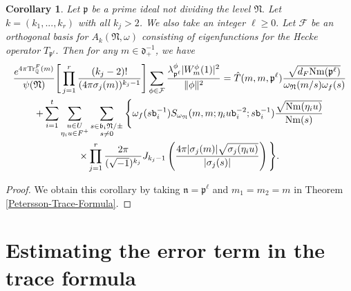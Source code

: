 \documentclass[reqno]{amsart}
\theoremstyle{plain}
\newtheorem{corollary}[theorem]{Corollary}
\theoremstyle{definition}
\theoremstyle{remark}
\def\Nr{\mathrm{Nm}}
\def\b{\mathtt b}
\begin{document}
\begin{corollary}
Let $\mathfrak{p}$ be a prime ideal not dividing the level $\mathfrak{N}.$   Let $k=(k_1,...,k_r)$ with all $k_j>2$. We also take an integer $\ell \geq 0.$ Let $\mathcal{F}$ be an orthogonal basis for $A_{k}(\mathfrak{N},\omega)$ consisting of eigenfunctions for the Hecke operator $T_\mathfrak{\mathfrak{p}^\ell}.$ Then for any $m\in \mathfrak{d}_+^{-1}$, we have
\begin{multline*} 
\frac{e^{4\pi \mathrm{Tr}_{\mathbb{Q}}^F (m)}}{\psi(\mathfrak{N})}\Bigg[\prod_{j=1}^r  \frac{(k_j-2)!}{(4\pi \sigma_j(m))^{k_j-1}}\Bigg]
\sum_{{\phi}\in \mathcal{F} }\frac{\lambda^\phi_\mathfrak{\mathfrak{p}^\ell}  |W_{m}^\phi(1)|^2 }{\|\phi \|^2}
=  \Hat{T}(m,m,\mathfrak{\mathfrak{p}^\ell}) \frac{\sqrt{d_F\Nr(\mathfrak{p}^\ell)}}{\omega_\mathfrak{N}(m/s)\omega_{f}(s)} \\
+\sum_{i=1}^t\sum_{\substack{u\in U \\ \eta_i u\in F^+}} \sum_{\substack{s\in \mathfrak{b_i}\mathfrak{N}/\pm \\ s\neq 0 }}\Bigg\{\omega_{f}(s\b_i^{-1} ) S_{\omega_\mathfrak{N}} (m,m;\eta_i u \b_i^{-2};s\b_i^{-1})
\frac{\sqrt{\Nr(\eta_i u)}} {\Nr(s)} \\
 \times \prod_{j=1}^r\frac{2\pi}{(\sqrt{-1})^{k_j}}J_{k_j-1} \left(  \frac{4 \pi    |\sigma_j(m)| \sqrt{\sigma_j (\eta_i u  )}}{|\sigma_j(s)|} \right) \Bigg\}.
\end{multline*}
\end{corollary}    
    
    \begin{proof}
    We obtain this corollary by taking $\mathfrak{n}=\mathfrak{p}^\ell$ and $m_1=m_2=m $   in Theorem \ref{Petersson-Trace-Formula}. 
    \end{proof}
\bigskip    

  
  
\section{Estimating the error term in the trace formula}\label{sec: error-term-estimate}
\end{document}
